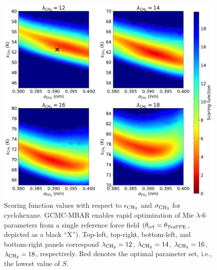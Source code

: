 \documentclass[journal=jced,manuscript=article]{achemso}
\begin{document}
	\begin{figure}[htb!]
		\centering
		\includegraphics[width=6.4in]{CYC6_scoring_function_lam_alt.pdf}
		\caption{Scoring function values with respect to $\epsilon_{\rm CH_2}$ and $\sigma_{\rm CH_2}$ for cyclohexane. GCMC-MBAR enables rapid optimization of Mie $\lambda$-6 parameters from a single reference force field $(\theta_{\rm ref} = \theta_{\rm TraPPE}$, depicted as a black ``X''). Top-left, top-right, bottom-left, and bottom-right panels correspond $\lambda_{\rm CH_2} = 12$, $\lambda_{\rm CH_2} = 14$, $\lambda_{\rm CH_2} = 16$, $\lambda_{\rm CH_2} = 18$, respectively. Red denotes the optimal parameter set, i.e., the lowest value of $S$.}%
		\label{fig:Score_CYC6}
	\end{figure} 
\end{document}
